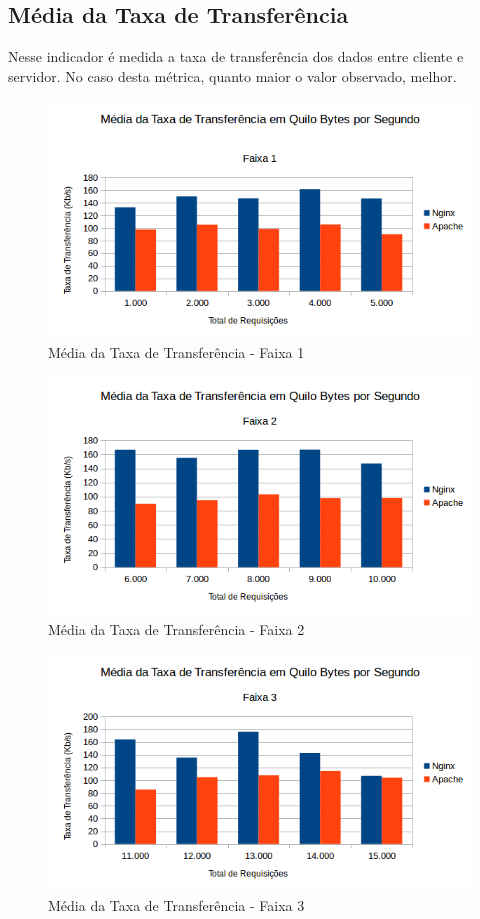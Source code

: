 \subsection{Média da Taxa de Transferência}
Nesse indicador é medida a taxa de transferência dos dados entre cliente e 
servidor. No caso desta métrica, quanto maior o valor observado, melhor.
\begin{figure}[H]
	\centering
	\includegraphics[width=1\linewidth]{graficos/grafico6-f1} 
	\caption{Média da Taxa de Transferência - Faixa 1}
	\label{fig:grafico6-f1}
\end{figure}
\begin{figure}[H]
	\centering
	\includegraphics[width=1\linewidth]{graficos/grafico6-f2} 
	\caption{Média da Taxa de Transferência - Faixa 2}
	\label{fig:grafico6-f2}
\end{figure}
\begin{figure}[H]
	\centering
	\includegraphics[width=1\linewidth]{graficos/grafico6-f3} 
	\caption{Média da Taxa de Transferência - Faixa 3}
	\label{fig:grafico6-f3}
\end{figure}
